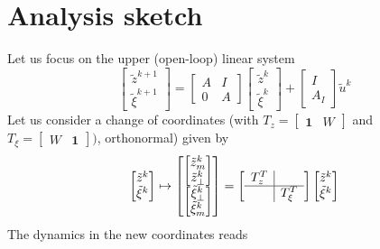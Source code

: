 \documentclass{book}
\newcommand{\fatone}{\boldsymbol{1}}
\theoremstyle{theoremv2}
\theoremstyle{defv2}
\theoremstyle{remark}
\theoremstyle{remark}
\theoremstyle{definition}
\theoremstyle{definition}
\begin{document}
\section{Analysis sketch}
Let us focus on the upper (open-loop) linear system
\[
    \begin{bmatrix}
        \tilde{z}^{k+1} \\ \tilde{\xi}^{k+1}
    \end{bmatrix} = \begin{bmatrix}
        A & I \\ 0 & A
    \end{bmatrix} \begin{bmatrix}
        \tilde{z}^{k} \\ \tilde{\xi}^{k}
    \end{bmatrix} + \begin{bmatrix}
        I \\ A_I
    \end{bmatrix} \tilde{u}^k
\]
Let us consider a change of coordinates (with $T_z = \left[\begin{array}{lr}
    \fatone & W
\end{array}\right]$ and $T_\xi = \left[\begin{array}{cc}
    W & \fatone 
\end{array}\right])$, orthonormal) given by 
\[
    \begin{bmatrix}
        \tilde{z}^k \\ \tilde{\xi}^k
    \end{bmatrix} \mapsto \begin{bmatrix}
        \begin{bmatrix}
            \tilde{z}^k_m \\ \tilde{z}^k_\perp
        \end{bmatrix} \\ \begin{bmatrix}
            \tilde{\xi}^k_\perp \\ \tilde{\xi}^k_m
        \end{bmatrix}
    \end{bmatrix} = \left[\begin{array}{c|c}
        T_z^T & \\ \hline & T_\xi^T
    \end{array}\right] \begin{bmatrix}
        \tilde{z}^k \\ \tilde{\xi}^k
    \end{bmatrix}
\]
The dynamics in the new coordinates reads 
\end{document}
